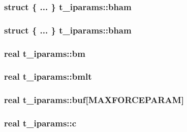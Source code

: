 \hypertarget{uniont__iparams_a386bc7c5c9d73b67d26b178f919cf7c2}{
\subsubsection[{bham}]{\setlength{\rightskip}{0pt plus 5cm}struct \{ ... \}   {\bf t\-\_\-iparams\-::bham}}}\label{uniont__iparams_a386bc7c5c9d73b67d26b178f919cf7c2}
\hypertarget{uniont__iparams_af6b5060342ebac43a4922c1c6543745a}{
\subsubsection[{bham}]{\setlength{\rightskip}{0pt plus 5cm}struct \{ ... \}   {\bf t\-\_\-iparams\-::bham}}}\label{uniont__iparams_af6b5060342ebac43a4922c1c6543745a}
\hypertarget{uniont__iparams_aedae1554764a6b432e2a73dcb678f30d}{
\subsubsection[{bm}]{\setlength{\rightskip}{0pt plus 5cm}real {\bf t\-\_\-iparams\-::bm}}}\label{uniont__iparams_aedae1554764a6b432e2a73dcb678f30d}
\hypertarget{uniont__iparams_a7f54768c60be5c76f2835aff5cd05d48}{
\subsubsection[{bmlt}]{\setlength{\rightskip}{0pt plus 5cm}real {\bf t\-\_\-iparams\-::bmlt}}}\label{uniont__iparams_a7f54768c60be5c76f2835aff5cd05d48}
\hypertarget{uniont__iparams_ac2b28e06a58d003b10de8a80e9aebe85}{
\subsubsection[{buf}]{\setlength{\rightskip}{0pt plus 5cm}real {\bf t\-\_\-iparams\-::buf}\mbox{[}{\bf \-M\-A\-X\-F\-O\-R\-C\-E\-P\-A\-R\-A\-M}\mbox{]}}}\label{uniont__iparams_ac2b28e06a58d003b10de8a80e9aebe85}
\hypertarget{uniont__iparams_a6f12f82807f6b417c8982bbb5a27af83}{
\subsubsection[{c}]{\setlength{\rightskip}{0pt plus 5cm}real {\bf t\-\_\-iparams\-::c}}}\label{uniont__iparams_a6f12f82807f6b417c8982bbb5a27af83}
